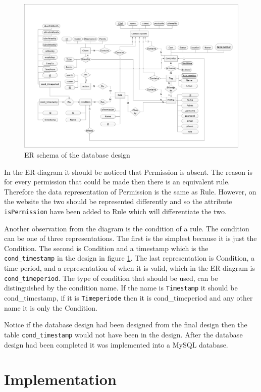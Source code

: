 \begin{figure}
	\centering
		\includegraphics[width=1.50\textwidth,  angle=90]{images/ERdiagram.jpg}
	\caption{ER schema of the database design}
	\label{fig:ERdiagram}
\end{figure}

In the ER-diagram it should be noticed that Permission is absent. The reason is for every permission that could be made then there is an equivalent rule. Therefore the data representation of Permission is the same as Rule. However, on the website the two should be represented differently and so the attribute \texttt{isPermission} have been added to Rule which will differentiate the two.

Another observation from the diagram is the condition of a rule. The condition can be one of three representations. The first is the simplest because it is just the Condition. The second is Condition and a timestamp which is the \texttt{cond\_timestamp} in the design in figure \ref{fig:ERdiagram}. The last representation is Condition, a time period, and a representation of when it is valid, which in the ER-diagram is \texttt{cond\_timeperiod}. The type of condition that should be used, can be distinguished by the condition name. If the name is \texttt{Timestamp} it should be cond\_timestamp, if it is \texttt{Timeperiode} then it is cond\_timeperiod and any other name it is only the Condition. 

Notice if the database design had been designed from the final design then the table \texttt{cond\_timestamp} would not have been in the design.
After the database design had been completed it was implemented into a MySQL database.  

\section{Implementation}

